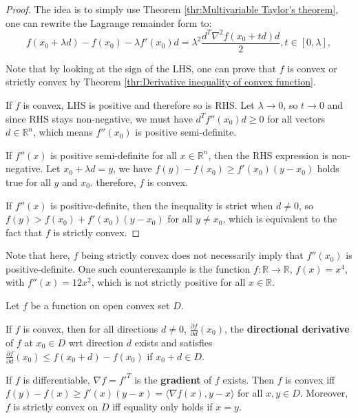 \begin{proof}
  The idea is to simply use Theorem \ref{thr:Multivariable Taylor's theorem},
  one can rewrite the Lagrange remainder form to:
  \[
    f(x_{0}+\lambda d)-f(x_{0})-\lambda f'(x_{0})d =\lambda^{2}
    \frac{d^{T}\nabla^{2}f(x_{0} + t d)d}{2}, t \in [0, \lambda],
  \]

  Note that by looking at the sign of the LHS, one can prove that \( f \) is
  convex or strictly convex by Theorem \ref{thr:Derivative inequality of convex
  function}.

  If \( f \) is convex, LHS is positive and therefore so is RHS. Let \( \lambda
  \to 0\), so \( t \to 0 \) and since RHS stays non-negative, we must have \(
  d^{T}f''(x_{0})d \ge 0 \) for all vectors \( d \in \mathbb{R}^{n} \), which
  means \( f''(x_{0}) \) is positive semi-definite.

  If \( f''(x) \) is positive semi-definite for all \( x \in \mathbb{R}^{n} \),
  then the RHS expression is non-negative. Let \( x_{0} + \lambda d = y \), we
  have \( f(y) - f(x_{0}) \ge f'(x_{0})(y - x_{0}) \) holds true for all \( y \)
  and \( x_{0} \). therefore, \( f \) is convex.

  If \( f''(x) \) is positive-definite, then the inequality is strict when \( d
  \neq 0 \), so \( f(y) > f(x_{0}) + f'(x_{0})(y - x_{0}) \) for all \( y \neq
  x_{0}\), which is equivalent to the fact that \( f \) is strictly convex.
\end{proof}

Note that here, \( f \) being strictly convex does not necessarily imply that \(
f''(x_{0})\) is positive-definite. One such counterexample is the function \( f:
\mathbb{R} \to  \mathbb{R}\), \( f(x) = x^{4} \), with \( f''(x) = 12x^2 \),
which is not strictly positive for all \( x \in \mathbb{R} \).


\iffalse
\begin{theorem}
  Let \( f \) be a function on open convex set \( D \).

  If \( f \) is convex, then for all directions \( d \neq  0 \),
  \( \frac{\partial f}{\partial d}(x_{0})  \), the
  \textbf{directional derivative} of \( f \) at \( x_{0} \in D \) wrt direction
  \( d \) exists and satisfies \( \frac{\partial f}{\partial d} (x_{0}) \le f(x_{0} + d) -
  f(x_{0}) \) if \( x_{0} + d \in D \).

  If \( f \) is differentiable, \( \nabla f = f'^{T} \) is the \textbf{gradient}
  of \( f \) exists. Then \( f \) is convex iff \( f(y)-f(x) \ge f'(x)(y-x)
   = \langle \nabla f(x), y -x\rangle\) for all \( x,y\in D \). Moreover, \( f
   \) is strictly convex on \( D \) iff equality only holds if \( x = y \).
\end{theorem}

